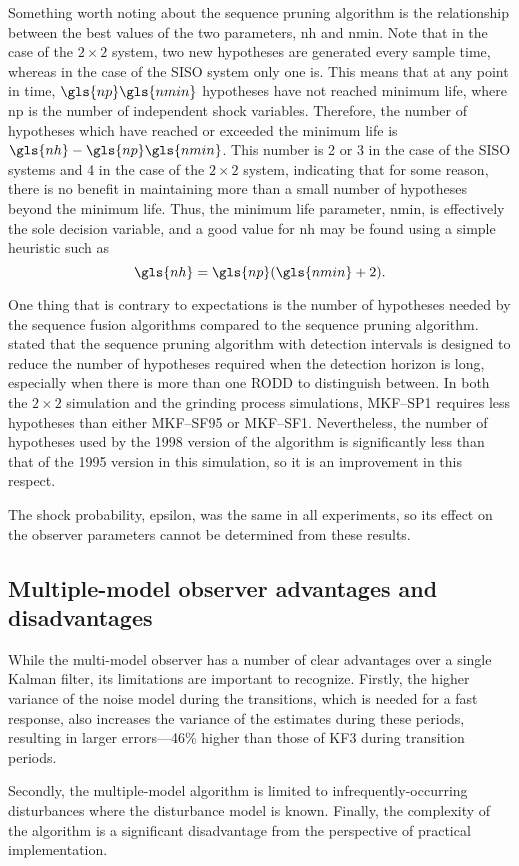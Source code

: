 Something worth noting about the sequence pruning algorithm is the relationship between the best values of the two parameters, \gls{nh} and \gls{nmin}. Note that in the case of the $2 \times 2$ system, two new hypotheses are generated every sample time, whereas in the case of the \gls{SISO} system only one is. This means that at any point in time, $\gls{np}\gls{nmin}$ hypotheses have not reached minimum life, where \gls{np} is the number of independent shock variables. Therefore, the number of hypotheses which have reached or exceeded the minimum life is $\gls{nh}-\gls{np}\gls{nmin}$. This number is 2 or 3 in the case of the \gls{SISO} systems and 4 in the case of the $2 \times 2$ system, indicating that for some reason, there is no benefit in maintaining more than a small number of hypotheses beyond the minimum life. Thus, the minimum life parameter, \gls{nmin}, is effectively the sole decision variable, and a good value for \gls{nh} may be found using a simple heuristic such as
\begin{equation} \label{eq:nh-sp}
	\gls{nh} = \gls{np}(\gls{nmin}+2).
\end{equation}

One thing that is contrary to expectations is the number of hypotheses needed by the sequence fusion algorithms compared to the sequence pruning algorithm. \cite{robertson_method_1998} stated that the sequence pruning algorithm with detection intervals is designed to reduce the number of hypotheses required when the detection horizon is long, especially when there is more than one \gls{RODD} to distinguish between. In both the $2 \times 2$ simulation and the grinding process simulations, MKF--SP1 requires less hypotheses than either MKF--SF95 or MKF--SF1. Nevertheless, the number of hypotheses used by the 1998 version of the algorithm is significantly less than that of the 1995 version in this simulation, so it is an improvement in this respect.

The shock probability, \gls{epsilon}, was the same in all experiments, so its effect on the observer parameters cannot be determined from these results.

\subsection{Multiple-model observer advantages and disadvantages}

While the multi-model observer has a number of clear advantages over a single Kalman filter, its limitations are important to recognize. Firstly, the higher variance of the noise model during the transitions, which is needed for a fast response, also increases the variance of the estimates during these periods, resulting in larger errors---46\% higher than those of KF3 during transition periods.

Secondly, the multiple-model algorithm is limited to infrequently-occurring disturbances where the disturbance model is known. Finally, the complexity of the algorithm is a significant disadvantage from the perspective of practical implementation.



